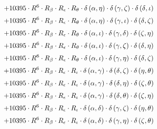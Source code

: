 \begin{subequations}
\begin{gather}
 \\[0.2em] \notag 		 + 10395 \cdot R^{6} \cdot R_{\beta{}} \cdot R_{\epsilon{}} \cdot R_{\theta{}} \cdot \delta{}\left(\alpha{}, \eta{}\right) \cdot \delta{}\left(\gamma{}, \zeta{}\right) \cdot \delta{}\left(\delta{}, \iota{}\right) 
 \\[0.2em] \notag 		 + 10395 \cdot R^{6} \cdot R_{\beta{}} \cdot R_{\epsilon{}} \cdot R_{\theta{}} \cdot \delta{}\left(\alpha{}, \eta{}\right) \cdot \delta{}\left(\gamma{}, \iota{}\right) \cdot \delta{}\left(\delta{}, \zeta{}\right) 
 \\[0.2em] \notag 		 + 10395 \cdot R^{6} \cdot R_{\beta{}} \cdot R_{\epsilon{}} \cdot R_{\theta{}} \cdot \delta{}\left(\alpha{}, \iota{}\right) \cdot \delta{}\left(\gamma{}, \delta{}\right) \cdot \delta{}\left(\zeta{}, \eta{}\right) 
 \\[0.2em] \notag 		 + 10395 \cdot R^{6} \cdot R_{\beta{}} \cdot R_{\epsilon{}} \cdot R_{\theta{}} \cdot \delta{}\left(\alpha{}, \iota{}\right) \cdot \delta{}\left(\gamma{}, \zeta{}\right) \cdot \delta{}\left(\delta{}, \eta{}\right) 
 \\[0.2em] \notag 		 + 10395 \cdot R^{6} \cdot R_{\beta{}} \cdot R_{\epsilon{}} \cdot R_{\theta{}} \cdot \delta{}\left(\alpha{}, \iota{}\right) \cdot \delta{}\left(\gamma{}, \eta{}\right) \cdot \delta{}\left(\delta{}, \zeta{}\right) 
 \\[0.2em] \notag 		 + 10395 \cdot R^{6} \cdot R_{\beta{}} \cdot R_{\epsilon{}} \cdot R_{\iota{}} \cdot \delta{}\left(\alpha{}, \gamma{}\right) \cdot \delta{}\left(\delta{}, \zeta{}\right) \cdot \delta{}\left(\eta{}, \theta{}\right) 
 \\[0.2em] \notag 		 + 10395 \cdot R^{6} \cdot R_{\beta{}} \cdot R_{\epsilon{}} \cdot R_{\iota{}} \cdot \delta{}\left(\alpha{}, \gamma{}\right) \cdot \delta{}\left(\delta{}, \eta{}\right) \cdot \delta{}\left(\zeta{}, \theta{}\right) 
 \\[0.2em] \notag 		 + 10395 \cdot R^{6} \cdot R_{\beta{}} \cdot R_{\epsilon{}} \cdot R_{\iota{}} \cdot \delta{}\left(\alpha{}, \gamma{}\right) \cdot \delta{}\left(\delta{}, \theta{}\right) \cdot \delta{}\left(\zeta{}, \eta{}\right) 
 \\[0.2em] \notag 		 + 10395 \cdot R^{6} \cdot R_{\beta{}} \cdot R_{\epsilon{}} \cdot R_{\iota{}} \cdot \delta{}\left(\alpha{}, \delta{}\right) \cdot \delta{}\left(\gamma{}, \zeta{}\right) \cdot \delta{}\left(\eta{}, \theta{}\right) 
 \\[0.2em] \notag 		 + 10395 \cdot R^{6} \cdot R_{\beta{}} \cdot R_{\epsilon{}} \cdot R_{\iota{}} \cdot \delta{}\left(\alpha{}, \delta{}\right) \cdot \delta{}\left(\gamma{}, \eta{}\right) \cdot \delta{}\left(\zeta{}, \theta{}\right) 

\end{gather}
\end{subequations}
